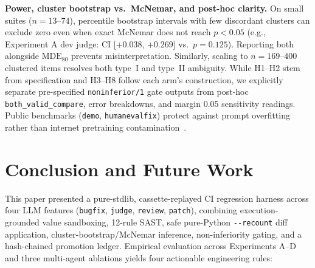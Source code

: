 \documentclass[conference]{IEEEtran}
\begin{document}
\textbf{Power, cluster bootstrap vs.\ McNemar, and post-hoc clarity.} On small suites ($n=13\text{--}74$), percentile bootstrap intervals with few discordant clusters can exclude zero even when exact McNemar does not reach $p < 0.05$ (e.g., Experiment A dev judge: CI [+0.038, +0.269] vs.\ $p=0.125$). Reporting both alongside $\mathrm{MDE}_{80}$ prevents misinterpretation. Similarly, scaling to $n=169\text{--}400$ clustered items resolves both type~I and type~II ambiguity. While H1--H2 stem from specification and H3--H8 follow each arm's construction, we explicitly separate pre-specified \texttt{noninferior/\allowbreak{}1} gate outputs from post-hoc \texttt{both\_\allowbreak{}valid\_\allowbreak{}compare}, error breakdowns, and margin 0.05 sensitivity readings. Public benchmarks (\texttt{demo}, \texttt{humanevalfix}) protect against prompt overfitting rather than internet pretraining contamination~\cite{sainz2023contamination,jain2025livecodebench}.

\section{Conclusion and Future Work}
\label{sec:conclusion}

This paper presented a pure-stdlib, cassette-replayed CI regression harness across four LLM features (\texttt{bugfix}, \texttt{judge}, \texttt{review}, \texttt{patch}), combining execution-grounded value sandboxing, 12-rule SAST, safe pure-Python \texttt{-{}-{}recount} diff application, cluster-bootstrap/McNemar inference, non-inferiority gating, and a hash-chained promotion ledger. Empirical evaluation across Experiments A--D and three multi-agent ablations yields four actionable engineering rules:
\end{document}

